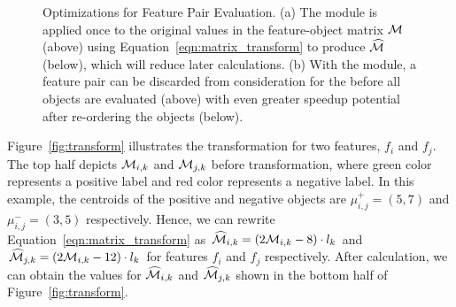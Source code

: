 
\begin{figure}[h]
\centering %
\vspace{-5mm}
\vspace{-5mm}
\caption{Optimizations for Feature Pair Evaluation. (a) The \trans module is applied once to the original values in the feature-object matrix ${\mathcal{M}}$ (above) using Equation~\ref{eqn:matrix_transform} to produce $\widehat{{\mathcal{M}}}$ (below), which will reduce later calculations. (b) With the \earlyT module, a feature pair can be discarded from consideration for the \topk before all objects are evaluated (above) with even greater speedup potential after re-ordering the objects (below).}
\vspace{-8mm}
\label{fig:trans_term}
\end{figure}

\begin{example}[Transformation]
Figure~\ref{fig:transform} illustrates the transformation for two features, $f_i$ and $f_j$. The top half depicts ${\mathcal{M}}_{i,k}$ and ${\mathcal{M}}_{j,k}$ before transformation, where green color represents a positive label and red color represents a negative label. In this example, the centroids of the positive and negative objects are $\mu_{i,j}^+=(5,7)$ and $\mu_{i,j}^-=(3,5)$ respectively. Hence, we can rewrite Equation~\ref{eqn:matrix_transform} as $\widehat{{\mathcal{M}}}_{i,k} = (2{\mathcal{M}}_{i,k}-8)\cdot l_k$ and $\widehat{{\mathcal{M}}}_{j,k} = (2{\mathcal{M}}_{i,k}-12)\cdot l_k$ for features $f_i$ and $f_j$ respectively. After calculation, we can obtain the values for $\widehat{{\mathcal{M}}}_{i,k}$ and $\widehat{{\mathcal{M}}}_{j,k}$ shown in the bottom half of Figure~\ref{fig:transform}.
\end{example}

